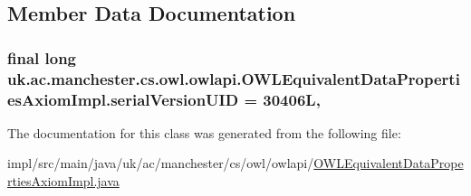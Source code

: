 \subsection{Member Data Documentation}
\hypertarget{classuk_1_1ac_1_1manchester_1_1cs_1_1owl_1_1owlapi_1_1_o_w_l_equivalent_data_properties_axiom_impl_a9b1c3ce5e3f4a57554de10d855d1345c}{
\subsubsection[{serial\-Version\-U\-I\-D}]{\setlength{\rightskip}{0pt plus 5cm}final long uk.\-ac.\-manchester.\-cs.\-owl.\-owlapi.\-O\-W\-L\-Equivalent\-Data\-Properties\-Axiom\-Impl.\-serial\-Version\-U\-I\-D = 30406\-L\hspace{0.3cm}{\ttfamily [static]}, {\ttfamily [private]}}}\label{classuk_1_1ac_1_1manchester_1_1cs_1_1owl_1_1owlapi_1_1_o_w_l_equivalent_data_properties_axiom_impl_a9b1c3ce5e3f4a57554de10d855d1345c}


The documentation for this class was generated from the following file\-:\begin{DoxyCompactItemize}
\item 
impl/src/main/java/uk/ac/manchester/cs/owl/owlapi/\hyperlink{_o_w_l_equivalent_data_properties_axiom_impl_8java}{O\-W\-L\-Equivalent\-Data\-Properties\-Axiom\-Impl.\-java}\end{DoxyCompactItemize}
